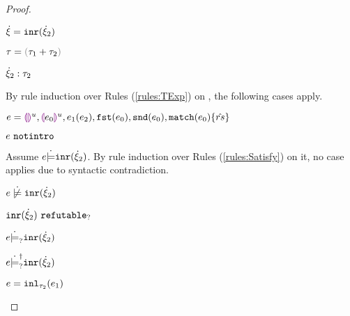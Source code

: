 \begin{proof}
\begin{byCases}
\begin{byCases}
    \end{byCases}
\item[\text{(\ref{rule:CTInr})}]
    \begin{pfsteps*}
    \item $\dot{\xi}=\mathtt{inr}(\dot{\xi}_2)$ 
    \item $\tau=\tsum{\tau_1}{\tau_2}$ 
    \item $\dot{\xi}_2 : \tau_2$  
    \end{pfsteps*}
    By rule induction over Rules (\ref{rules:TExp}) on , the following cases apply.
    \begin{byCases}
    \item[\text{(\ref{rule:TEHole}),(\ref{rule:THole}),(\ref{rule:TAp}),(\ref{rule:TFst}),(\ref{rule:TSnd}),(\ref{rule:TMatchZPre}),(\ref{rule:TMatchNZPre})}]
        \begin{pfsteps*}
        \item $e=\textcolor{violet}{\llparenthesis}\textcolor{violet}{\rrparenthesis}^{u},\textcolor{violet}{\llparenthesis} e_0\textcolor{violet}{\rrparenthesis}^{u},e_1(e_2),\mathtt{fst}(e_0),\mathtt{snd}(e_0),\mathtt{match}(e_0) \{\hat{rs}\}$ 
        \item $e ~\mathtt{notintro}$  
        \end{pfsteps*}
        Assume $e \dot{\models} \mathtt{inr}(\dot{\xi}_2)$. By rule induction over Rules (\ref{rules:Satisfy}) on it, no case applies due to syntactic contradiction.
        \begin{pfsteps*}
        \item $\cnotsatisfy{e}{\cinr{\hxi_2}}$  
        \item $\mathtt{inr}(\dot{\xi}_2) ~\mathtt{refutable}_?$  
        \item $e \dot{\models}_{?} \mathtt{inr}(\dot{\xi}_2)$  
        \item $e \dot{\models}_{?}^{\dag} \mathtt{inr}(\dot{\xi}_2)$ 
        \end{pfsteps*}
    \item[\text{(\ref{rule:TInl})}]
        \begin{pfsteps*}
        \item $e=\mathtt{inl}_{\tau_2}({e_1})$ 
        \end{pfsteps*}

\end{byCases}
\end{byCases}
\end{proof}
